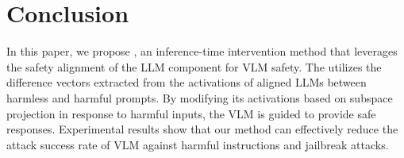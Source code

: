 
\section{Conclusion}
In this paper, we propose \MODEL, an inference-time intervention method that leverages the safety alignment of the LLM component for VLM safety. 
The \MODEL utilizes the difference vectors extracted from the activations of aligned LLMs between harmless and harmful prompts. By modifying its activations based on subspace projection in response to harmful inputs, the VLM is guided to provide safe responses. Experimental results show that our method can effectively reduce the attack success rate of VLM against harmful instructions and jailbreak attacks.



